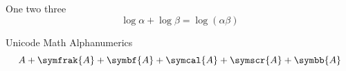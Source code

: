 \documentclass[a4paper]{article}
\begin{document}
One two three
\[
\log\alpha+\log\beta=\log(\alpha\beta)
\]

Unicode Math Alphanumerics
\[
A+\symfrak{A}+\symbf{A}+\symcal{A}+\symscr{A}+\symbb{A}
\]
\end{document}
